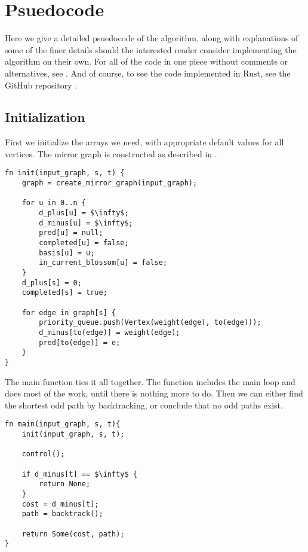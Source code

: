 \section{Psuedocode}
Here we give a detailed psuedocode of the algorithm, along with explanations of some of the finer details should the interested reader consider implementing the algorithm on their own. For all of the code in one piece without comments or alternatives, see . And of course, to see the code implemented in Rust, see the GitHub repository .

\subsection{Initialization}
First we initialize the arrays we need, with appropriate default values for all vertices. The mirror graph is constructed as described in .
\begin{lstlisting}[caption={Initialization},label=Listing,mathescape=true]
fn init(input_graph, s, t) {
    graph = create_mirror_graph(input_graph);

    for u in 0..n {
        d_plus[u] = $\infty$;
        d_minus[u] = $\infty$;
        pred[u] = null;
        completed[u] = false;
        basis[u] = u;
        in_current_blossom[u] = false;
    }
    d_plus[s] = 0;
    completed[s] = true;

    for edge in graph[s] {
        priority_queue.push(Vertex(weight(edge), to(edge)));
        d_minus[to(edge)] = weight(edge);
        pred[to(edge)] = e;
    }
}
\end{lstlisting}

The main function ties it all together. The  function includes the main loop and does most of the work, until there is nothing more to do. Then we can either find the shortest odd path by backtracking, or conclude that no odd paths exist.
\begin{lstlisting}[caption={Main},label=Listing,mathescape=true]
fn main(input_graph, s, t){
    init(input_graph, s, t);

    control();

    if d_minus[t] == $\infty$ {
        return None;
    }
    cost = d_minus[t];
    path = backtrack();
    
    return Some(cost, path);
}
\end{lstlisting}

